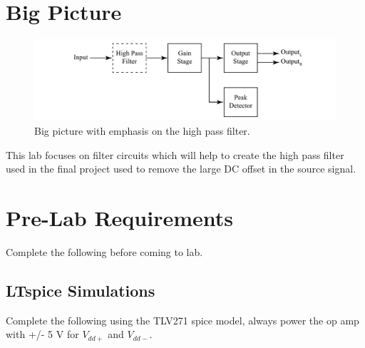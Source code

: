 \section{Big Picture}

\begin{figure} [h]
	\centering
		\includegraphics[width=1\textwidth]{Lab9bigpicture.pdf}
	\caption{Big picture with emphasis on the high pass filter.} \label{fig:9bp}
\end{figure}

This lab focuses on filter circuits which will help to create the high pass filter used in the final project used to remove the large DC offset in the source signal. 

\section{Pre-Lab Requirements}

Complete the following before coming to lab. 

\subsection{LTspice Simulations} \label{ssec:9spice}

Complete the following using the TLV271 spice model, always power the op amp with +/- 5 V for $V_{dd+}$ and $V_{dd-}$.

